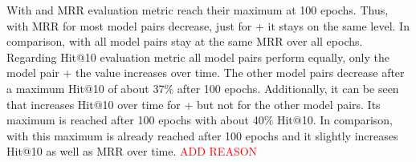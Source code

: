 With \usmax and \ussoftmax MRR evaluation metric reach their maximum at 100 epochs. 
Thus, with \usmax MRR for most model pairs decrease, just for \complex + \transe it stays on the same level.
In comparison, with \ussoftmax all model pairs stay at the same MRR over all epochs.
Regarding Hit@10 evaluation metric all model pairs perform equally, only the model pair \complex + \transe the value increases over time.
The other model pairs decrease after a maximum Hit@10 of about 37\% after 100 epochs.
Additionally, it can be seen that \usmax increases Hit@10 over time for \complex + \transe but not for the other model pairs.
Its maximum is reached after 100 epochs with about 40\% Hit@10.
In comparison, with \ussoftmax this maximum is already reached after 100 epochs and it slightly increases Hit@10 as well as MRR over time.
\textcolor{red}{ADD REASON}


